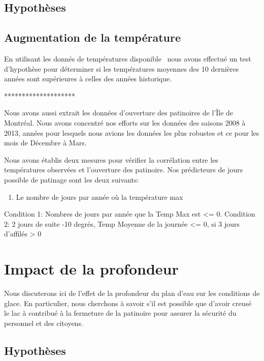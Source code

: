 \documentclass[12pt]{article}
\numberwithin{figure}{section}
\begin{document}
\subsection{Hypoth\`eses}

\subsection{Augmentation de la temp\'erature}

En utilisant les donn\'es de temp\'eratures disponible~\cite{TempHist} nous avons effectu\'e un test
d'hypoth\`ese pour d\'eterminer si les temp\'eratures moyennes des 10 derni\`eres ann\'ees sont
sup\'erieures \`a celles des ann\'ees historique.

********************

Nous avons aussi extrait les donn\'ees d'ouverture des patinoires de l'\^Ile de Montr\'eal. Nous
avons concentr\'e nos efforts sur les donn\'ees des saisons 2008 \`a 2013, ann\'ees pour lesquels
nous avions les donn\'ees les plus robustes et ce pour les mois de D\'ecembre \`a Mars.

Nous avons \'etablis deux mesures pour v\'erifier la corr\'elation entre les temp\'eratures
observ\'ees et l'ouverture des patinoire. Nos pr\'edicteurs de jours possible de patinage sont les
deux suivants:

\begin{enumerate}
    \item Le nombre de jours par ann\'ee o\`u la temp\'erature max
\end{enumerate}

Condition 1: Nombres de jours par ann\'ee que la Temp Max est <= 0.
Condition 2: 2 jours de suite -10 degr\'es, Temp Moyenne de la journ\'ee <= 0, si 3 jours d'affil\'es > 0

\section{Impact de la profondeur}

Nous discuterons ici de l'effet de la profondeur du plan d'eau sur les conditions de glace. En
particulier, nous cherchons \`a savoir s'il est possible que d'avoir creus\'e~\cite{Lac} le lac \`a
contribu\'e \`a la fermeture de la patinoire pour assurer la s\'ecurit\'e du personnel et des
citoyens.

\subsection{Hypoth\`eses}
\end{document}
